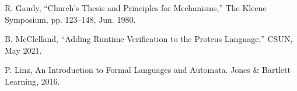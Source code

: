 \documentclass[12pt]{report}
\newcommand{\startarabic}{
  \clearpage
  \pagenumbering{arabic}
}
\begin{document}
    \newpage

    

    \newpage

    \startarabic %

    
    
    
    

    \newpage


    \begin{thebibliography}{}

         R. Gandy, “Church’s Thesis and Principles for Mechanisms,” The Kleene Symposium, pp. 123–148, Jun. 1980.

         B. McClelland, “Adding Runtime Verification to the Proteus Language,” CSUN, May 2021.

         P. Linz, An Introduction to Formal Languages and Automata. Jones \& Bartlett Learning, 2016.

    \end{thebibliography}
\end{document}
